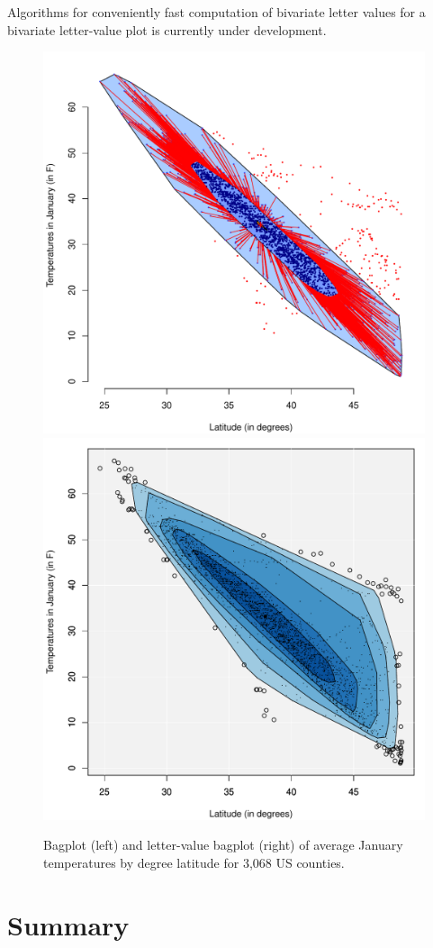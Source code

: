 \documentclass[oneside]{article}
\begin{document}
Algorithms for conveniently fast computation of bivariate letter values for a bivariate letter-value plot is currently under development.

\begin{figure}[hbtp]
  \centering
  \includegraphics[width=0.5\linewidth]{images/counties-bag}%
  \includegraphics[width=0.5\linewidth]{images/counties-lvbag}

  \caption{Bagplot (left) and letter-value bagplot (right) of average January
  temperatures by degree latitude for 3,068 US counties. }

  \label{counties-bag} 

\end{figure}

\section{Summary}
\label{sec:summary}
\end{document}
